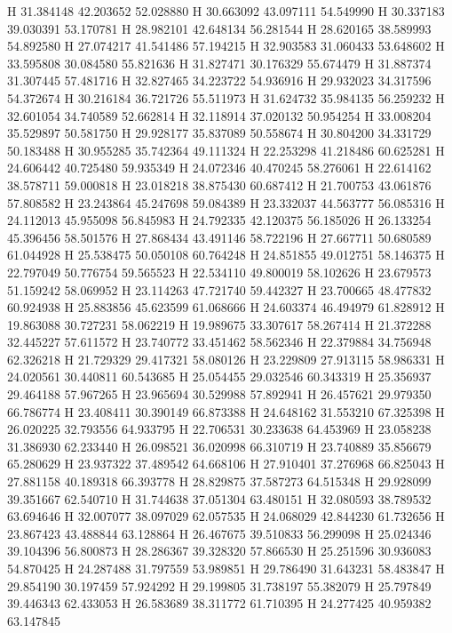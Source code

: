 \documentclass{article}
\begin{document}
H 31.384148 42.203652 52.028880
H 30.663092 43.097111 54.549990
H 30.337183 39.030391 53.170781
H 28.982101 42.648134 56.281544
H 28.620165 38.589993 54.892580
H 27.074217 41.541486 57.194215
H 32.903583 31.060433 53.648602
H 33.595808 30.084580 55.821636
H 31.827471 30.176329 55.674479
H 31.887374 31.307445 57.481716
H 32.827465 34.223722 54.936916
H 29.932023 34.317596 54.372674
H 30.216184 36.721726 55.511973
H 31.624732 35.984135 56.259232
H 32.601054 34.740589 52.662814
H 32.118914 37.020132 50.954254
H 33.008204 35.529897 50.581750
H 29.928177 35.837089 50.558674
H 30.804200 34.331729 50.183488
H 30.955285 35.742364 49.111324
H 22.253298 41.218486 60.625281
H 24.606442 40.725480 59.935349
H 24.072346 40.470245 58.276061
H 22.614162 38.578711 59.000818
H 23.018218 38.875430 60.687412
H 21.700753 43.061876 57.808582
H 23.243864 45.247698 59.084389
H 23.332037 44.563777 56.085316
H 24.112013 45.955098 56.845983
H 24.792335 42.120375 56.185026
H 26.133254 45.396456 58.501576
H 27.868434 43.491146 58.722196
H 27.667711 50.680589 61.044928
H 25.538475 50.050108 60.764248
H 24.851855 49.012751 58.146375
H 22.797049 50.776754 59.565523
H 22.534110 49.800019 58.102626
H 23.679573 51.159242 58.069952
H 23.114263 47.721740 59.442327
H 23.700665 48.477832 60.924938
H 25.883856 45.623599 61.068666
H 24.603374 46.494979 61.828912
H 19.863088 30.727231 58.062219
H 19.989675 33.307617 58.267414
H 21.372288 32.445227 57.611572
H 23.740772 33.451462 58.562346
H 22.379884 34.756948 62.326218
H 21.729329 29.417321 58.080126
H 23.229809 27.913115 58.986331
H 24.020561 30.440811 60.543685
H 25.054455 29.032546 60.343319
H 25.356937 29.464188 57.967265
H 23.965694 30.529988 57.892941
H 26.457621 29.979350 66.786774
H 23.408411 30.390149 66.873388
H 24.648162 31.553210 67.325398
H 26.020225 32.793556 64.933795
H 22.706531 30.233638 64.453969
H 23.058238 31.386930 62.233440
H 26.098521 36.020998 66.310719
H 23.740889 35.856679 65.280629
H 23.937322 37.489542 64.668106
H 27.910401 37.276968 66.825043
H 27.881158 40.189318 66.393778
H 28.829875 37.587273 64.515348
H 29.928099 39.351667 62.540710
H 31.744638 37.051304 63.480151
H 32.080593 38.789532 63.694646
H 32.007077 38.097029 62.057535
H 24.068029 42.844230 61.732656
H 23.867423 43.488844 63.128864
H 26.467675 39.510833 56.299098
H 25.024346 39.104396 56.800873
H 28.286367 39.328320 57.866530
H 25.251596 30.936083 54.870425
H 24.287488 31.797559 53.989851
H 29.786490 31.643231 58.483847
H 29.854190 30.197459 57.924292
H 29.199805 31.738197 55.382079
H 25.797849 39.446343 62.433053
H 26.583689 38.311772 61.710395
H 24.277425 40.959382 63.147845
\end{document}
